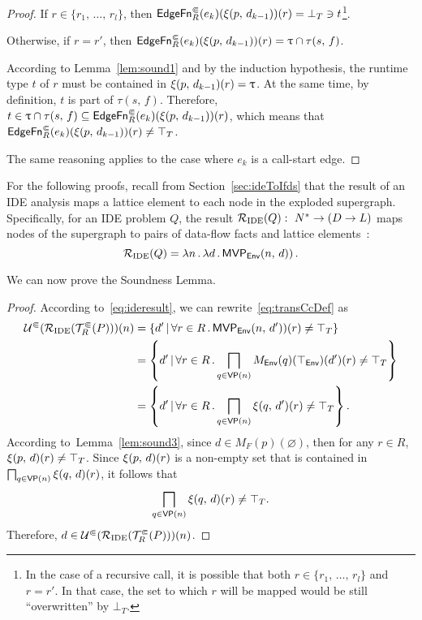 \begin{proof}
    If $r\in\{r_1,\,\dots,\,r_l\}$, then $\textsf{EdgeFn}^\Subset_{R}(e_k)(\xi(p,\,d_{k-1}))(r)=\bot_T\ni t$\footnote{In the case of a recursive call, it is possible that both $r\in\{r_1,\,\dots,\,r_l\}$ and $r=r'$.
    In that case, the set to which $r$ will be mapped would be still ``overwritten'' by $\bot_T$.}.
    
    Otherwise, if $r=r'$, then $\textsf{EdgeFn}^\Subset_{R}(e_k)(\xi(p,\,d_{k-1}))(r)=\uptau\cap\tau(s,\,f)$.

    According to Lemma~\ref{lem:sound1} and by the induction hypothesis, the runtime type $t$ of $r$ must be contained in $\xi(p,\,d_{k-1})(r)=\uptau$. At the same time, by definition, $t$ is part of $\tau(s,\,f)$. Therefore, $t\in\uptau\cap\tau(s,\,f)\subseteq\textsf{EdgeFn}^\Subset_{R}(e_k)(\xi(p,\,d_{k-1}))(r)$, which means that $\textsf{EdgeFn}^\Subset_{R}(e_k)(\xi(p,\,d_{k-1}))(r)\ne\top_T$.
    
    The same reasoning applies to the case where $e_k$ is a call-start edge.
\end{proof}

For the following proofs, recall from Section~\ref{sec:ideToIfds} that the result of an IDE analysis maps a lattice element to each node in the exploded supergraph. Specifically, for an IDE problem $Q$, the result $\mathcal R_{\text{IDE}}(Q):\ N^*\to(D\to L)$ maps nodes of the supergraph to pairs of data-flow facts and lattice elements~\cite{sagiv1996precise}:
\begin{equation}\label{eq:ideresult}
  \mathcal R_{\text{IDE}}(Q)=\lambda n\,.\,\lambda d\,.\,\textsf{MVP}_{\textsf{Env}}(n,\,d))\,.
\end{equation}

We can now prove the Soundness Lemma.

\sound*
\begin{proof}
According to~\eqref{eq:ideresult}, we can rewrite~\eqref{eq:transCcDef} as
\begin{align*}\label{eq:transCcResultCc}
  \mathcal U^\Subset(\mathcal R_{\text{IDE}}(\mathcal T^\Subset_R(P)))(n)
  &=\{d'\,|\,\forall r\in R\,.\,\textsf{MVP}_{\textsf{Env}}(n,\,d'))(r)\ne\top_T\}\\
  &=\left\{d'\,|\,\forall r\in R\,.\bigsqcap_{q\in\textsf{VP}(n)}M_\textsf{Env}(q)(\top_\textsf{Env})(d')(r)\ne\top_T\right\}\\
  &=\left\{d'\,|\,\forall r\in R\,.\bigsqcap_{q\in\textsf{VP}(n)}\xi(q,\,d')(r)\ne\top_T\right\}.
\end{align*}
  According to~Lemma~\ref{lem:sound3}, since $d\in M_F(p)(\varnothing)$, then for any $r\in R$, $\xi(p,\,d)(r)\ne\top_T$. 
  Since $\xi(p,\,d)(r)$ is a non-empty set that is contained in $\bigsqcap_{q\in\textsf{VP}(n)}\xi(q,\,d)(r)$, it follows that $$\bigsqcap_{q\in\textsf{VP}(n)}\xi(q,\,d)(r)\ne\top_T.$$ Therefore, $d\in \mathcal U^\Subset(\mathcal R_{\text{IDE}}(\mathcal T^\Subset_R(P)))(n)$.
\end{proof}

